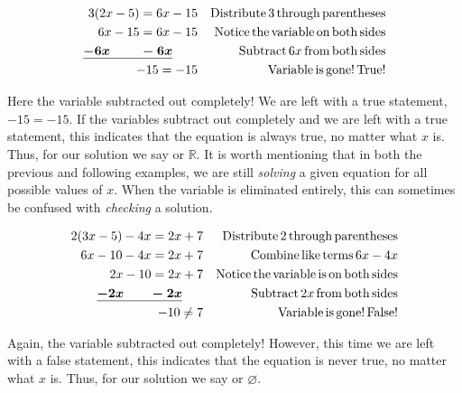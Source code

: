 \begin{example}\label{Lin27}
  \begin{eqnarray*}
    3 (2 x - 5) = 6 x - 15 &  & \operatorname{Distribute} 3 \operatorname{through}
    \operatorname{parentheses}\\
    6 x - 15 = 6 x - 15 &  & \operatorname{Notice} \operatorname{the} \operatorname{variable}
    \operatorname{on} \operatorname{both} \operatorname{sides}\\
    \boldsymbol{\underline{- 6 x ~~~~~~~- 6 x}}~~~~~~  &  & \operatorname{Subtract} 6 x \operatorname{from}
    \operatorname{both} \operatorname{sides}\\
    - 15 = - 15 &  & \operatorname{Variable} \operatorname{is} \operatorname{gone} ! \operatorname{True} !
  \end{eqnarray*}
\end{example}

   Here the variable subtracted out completely! We are left with a true
  statement, $- 15 = - 15$. If the variables subtract out completely and we
  are left with a true statement, this indicates that the equation is always
  true, no matter what $x$ is. Thus, for our solution we say {} or $\mathbb{R}$.\pp
	It is worth mentioning that in both the previous and following examples, we are still \textit{solving} a given equation for all possible values of $x$.  When the variable is eliminated entirely, this can sometimes be confused with \textit{checking} a solution.

\begin{example}\label{Lin28}
  
  \begin{eqnarray*}
    2 (3 x - 5) - 4 x = 2 x + 7 &  & \operatorname{Distribute} 2 \operatorname{through}
    \operatorname{parentheses}\\
    6 x - 10 - 4 x = 2 x + 7 &  & \operatorname{Combine} \operatorname{like} \operatorname{terms} 6 x
    - 4 x\\
    2 x - 10 = 2 x + 7 &  & \operatorname{Notice} \operatorname{the} \operatorname{variable} \operatorname{is}
    \operatorname{on} \operatorname{both} \operatorname{sides}\\
    \boldsymbol{\underline{- 2 x ~~~~~~- 2 x} }~~~~~  &  & \operatorname{Subtract} 2 x \operatorname{from}
    \operatorname{both} \operatorname{sides}\\
    - 10 \neq 7 &  & \operatorname{Variable} \operatorname{is} \operatorname{gone} ! \operatorname{False} !
  \end{eqnarray*}
\end{example}

   Again, the variable subtracted out completely! However, this time we are
  left with a false statement, this indicates that the equation is never true,
  no matter what $x$ is. Thus, for our solution we say {} or $\varnothing$.